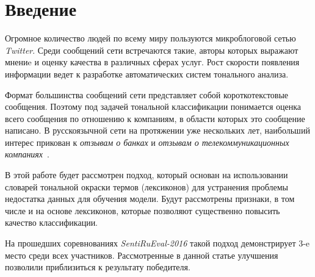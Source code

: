 \section{Введение}
Огромное количество людей по всему миру пользуются микроблоговой сетью
{\it Twitter}.
Среди сообщений сети встречаются такие, авторы которых выражают мнениe и оценку
качества в различных сферах услуг.
Рост скорости появления информации ведет к разработке автоматических систем
тонального анализа.~\cite{tonalityAnalysis}

Формат большинства сообщений сети представляет собой короткотекстовые
сообщения. Поэтому под задачей тональной классификации понимается оценка всего
сообщения по отношению к компаниям, в области которых это сообщение написано.
В русскоязычной сети на протяжении уже нескольких лет, наибольший интерес прикован к
{\it отзывам о банках} и {\it отзывам о телекоммуникационных компаниях}~\cite{dialog2015,dialog2016}.

В этой работе будет рассмотрен подход, который основан на использовании
словарей тональной окраски термов (лексиконов) для устранения проблемы недостатка
данных для обучения модели.
Будут рассмотрены признаки, в том числе и на основе лексиконов, которые позволяют
существенно повысить качество классификации.

На прошедших соревнованиях {\it SentiRuEval-2016} такой подход демонстрирует
3-e место среди всех участников. Рассмотренные в данной статье улучшения
позволили приблизиться к результату победителя.
